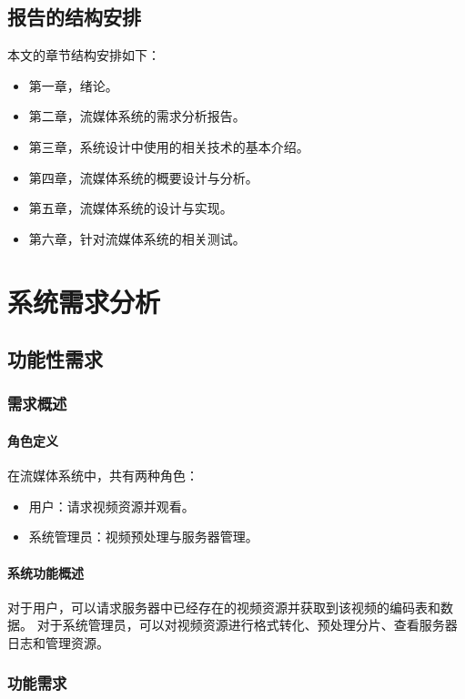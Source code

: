 \documentclass[bachelor]{thesis-uestc}
\begin{document}
\section{报告的结构安排}
本文的章节结构安排如下：

\begin{itemize}
	\item 第一章，绪论。
 	\item 第二章，流媒体系统的需求分析报告。
	\item 第三章，系统设计中使用的相关技术的基本介绍。
	\item 第四章，流媒体系统的概要设计与分析。
	\item 第五章，流媒体系统的设计与实现。
	\item 第六章，针对流媒体系统的相关测试。
\end{itemize}

\chapter{系统需求分析}

\section{功能性需求}
\subsection{需求概述}
\subsubsection{角色定义}
在流媒体系统中，共有两种角色：

\begin{itemize}
	\item 用户：请求视频资源并观看。
	\item 系统管理员：视频预处理与服务器管理。
\end{itemize}

\subsubsection{系统功能概述}

对于用户，可以请求服务器中已经存在的视频资源并获取到该视频的编码表和数据。
对于系统管理员，可以对视频资源进行格式转化、预处理分片、查看服务器日志和管理资源。

\subsection{功能需求}
\end{document}
